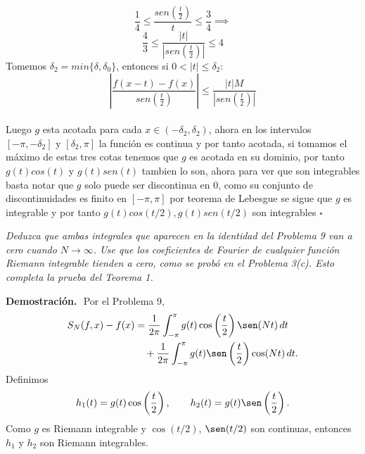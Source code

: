 \documentclass[11pt,letterpaper]{article}
\newcommand{\dt}{\,dt}
\begin{document}
\begin{equation*}
    \frac{1}{4}\leq\frac{sen\left(\frac{t}{2}\right)}{t}\leq \frac{3}{4}\implies
\end{equation*}
\begin{equation*}
    \frac{4}{3}\leq\frac{|t|}{\left|sen\left(\frac{t}{2}\right)\right|}\leq 4
\end{equation*}
Tomemos $\delta_2=min\{\delta,\delta_0\}$, entonces si $0<|t|\leq\delta_2$:\,\\
\begin{equation*}
    \left|\frac{f(x-t)-f(x)}{sen\left(\frac{t}{2}\right)}\right|\leq \frac{|t|M}{\left|sen\left(\frac{t}{2}\right)\right|}
\end{equation*}\,\\
Luego $g$ esta acotada para cada $x\in (-\delta_2,\delta_2)$, ahora en los intervalos $[-\pi,-\delta_2]$ y $[\delta_2,\pi]$ la funci\'on es continua y por tanto acotada,
si tomamos el m\'aximo de estas tres cotas tenemos que $g$ es acotada en su dominio, por tanto $g(t)cos(t)$ y $g(t)sen(t)$ tambien lo son, ahora para ver que son integrables basta notar que $g$ solo puede ser discontinua en $0$, como su conjunto de discontinuidades es finito en $[-\pi,\pi]$ por teorema de Lebesgue se sigue que $g$ es integrable y por tanto $g(t)cos(t/2),g(t)sen(t/2)$ son integrables 
\hfill $\square$

\begin{tcolorbox}[title=\textcolor{white}{Problema 11}]
\textit{Deduzca que ambas integrales que aparecen en la identidad del Problema 9 van a cero cuando $N\to\infty$. Use que los coeficientes de Fourier de cualquier función Riemann integrable tienden a cero, como se probó en el Problema 3(c). Esto completa la prueba del Teorema 1.}
\end{tcolorbox}

\textbf{Demostración.}\,\
Por el Problema 9,
\begin{align*}
    S_N(f,x)-f(x)
    &=\frac{1}{2\pi}\int_{-\pi}^{\pi}g(t)\cos\left(\frac{t}{2}\right)\sen(Nt)\dt \\
    &\quad +\frac{1}{2\pi}\int_{-\pi}^{\pi}g(t)\sen\left(\frac{t}{2}\right)\cos(Nt)\dt.
\end{align*}
Definimos
\begin{equation*}
    h_1(t)=g(t)\cos\left(\frac{t}{2}\right),
    \qquad
    h_2(t)=g(t)\sen\left(\frac{t}{2}\right).
\end{equation*}
Como $g$ es Riemann integrable y $\cos(t/2)$, $\sen(t/2)$ son continuas, entonces $h_1$ y $h_2$ son Riemann integrables.
\end{document}
